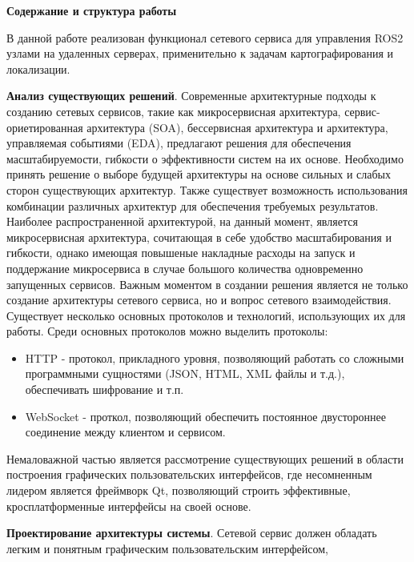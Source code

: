 \documentclass[a4paper, 14pt]{extreport}
\begin{document}
\vspace{2mm}
\par\noindent\textbf{Содержание и структура работы}
\vspace{2mm}
\par В данной работе реализован функционал сетевого сервиса для управления ROS2 узлами на удаленных серверах, применительно к
 задачам картографирования и локализации.
\par \textbf{Анализ существующих решений}. Современные архитектурные подходы к созданию сетевых сервисов, такие как микросервисная
 архитектура\cite{microServiceBook}\cite{microServiceBook1}, сервис-ориетированная архитектура (SOA)\cite{soaBook}\cite{soaBook1},
 бессервисная архитектура\cite{serverlessBook}\cite{serverlessBook1}\cite{serverlessArt1} и архитектура, управляемая событиями (EDA)\cite{edaBook}, предлагают 
 решения для обеспечения масштабируемости, гибкости о эффективности систем на их основе. Необходимо принять решение о выборе будущей архитектуры на основе 
 сильных и слабых сторон существующих архитектур. Также существует возможность использования комбинации различных архитектур для обеспечения требуемых 
 результатов. Наиболее распространенной архитектурой, на данный момент, является микросервисная архитектура, сочитающая в себе удобство масштабирования
 и гибкости, однако имеющая повышеные накладные расходы на запуск и поддержание микросервиса в случае большого количества одновременно запущенных сервисов.
 Важным моментом
 в создании решения является не только создание архитектуры сетевого сервиса, но и вопрос сетевого взаимодействия. Существует несколько
 основных протоколов\cite{protocolBook}\cite{protocolArt1} и технологий, использующих их для работы. Среди основных протоколов можно выделить протоколы: 
 \begin{itemize}
        \item HTTP - протокол, прикладного уровня, позволяющий работать со сложными программными сущностями (JSON, HTML, XML файлы и т.д.), обеспечивать шифрование и т.п.
        \item  WebSocket - проткол, позволяющий обеспечить постоянное двустороннее соединение между клиентом и сервисом.
\end{itemize}
 Немаловажной частью является рассмотрение существующих 
 решений в области построения графических пользовательских интерфейсов\cite{guiBrief}\cite{guiArt1}, где несомненным лидером является фреймворк Qt, позволяющий 
 строить эффективные, кросплатформенные интерфейсы на своей основе.
\par\textbf{Проектирование архитектуры системы}. Сетевой сервис должен обладать легким и понятным графическим пользовательским интерфейсом,
\end{document}
